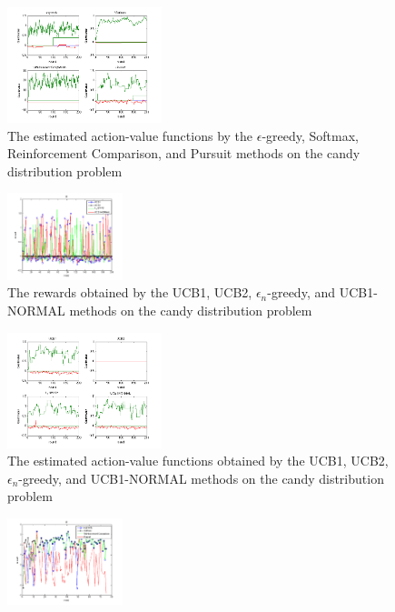 \documentclass[conference]{IEEEtran}
\begin{document}
\begin{figure}[h]
	\center	
	\includegraphics[width=0.4\textwidth]{fig/sutton_candy_qr.png}
	\caption{The estimated action-value functions by the $\epsilon$-greedy, Softmax, Reinforcement Comparison, and Pursuit methods on the candy distribution problem}
	\label{sutton_candy_qr}
\end{figure}

\begin{figure}[h]
	\center	
	\includegraphics[width=0.3\textwidth]{fig/ucb_candy_r.png}
	\caption{The rewards obtained by the UCB1, UCB2, $\epsilon_n$-greedy, and UCB1-NORMAL methods on the candy distribution problem}
	\label{ucb_candy_r}
\end{figure}


\begin{figure}[h]
	\center	
	\includegraphics[width=0.4\textwidth]{fig/ucb_candy_qr.png}
	\caption{The estimated action-value functions obtained by the UCB1, UCB2, $\epsilon_n$-greedy, and UCB1-NORMAL methods on the candy distribution problem}
	\label{ucb_candy_qr}
\end{figure}





\begin{figure}[h]
	\center	
	\includegraphics[width=0.3\textwidth]{fig/sutton_random_r.png}
	\caption{}
	\label{sutton_random_r}
\end{figure}
\end{document}
